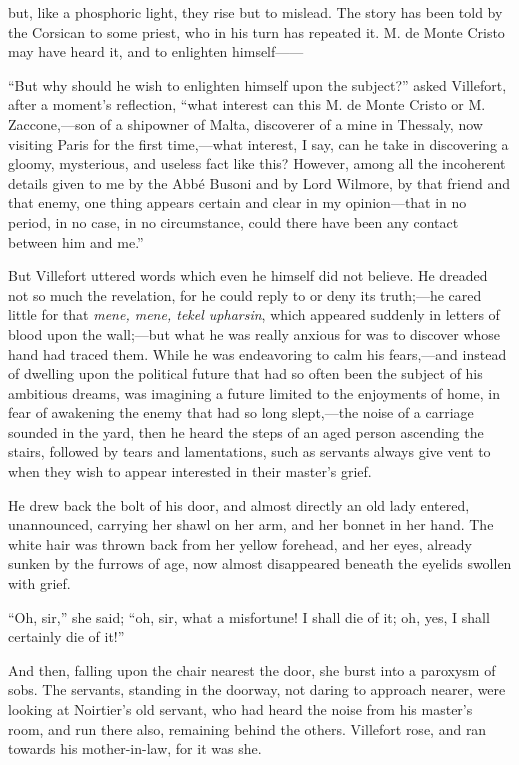 but, like a phosphoric light, they rise but to mislead. The story has
been told by the Corsican to some priest, who in his turn has repeated
it. M. de Monte Cristo may have heard it, and to enlighten himself——

“But why should he wish to enlighten himself upon the subject?” asked
Villefort, after a moment’s reflection, “what interest can this M. de
Monte Cristo or M. Zaccone,—son of a shipowner of Malta, discoverer of
a mine in Thessaly, now visiting Paris for the first time,—what
interest, I say, can he take in discovering a gloomy, mysterious, and
useless fact like this? However, among all the incoherent details given
to me by the Abbé Busoni and by Lord Wilmore, by that friend and that
enemy, one thing appears certain and clear in my opinion—that in no
period, in no case, in no circumstance, could there have been any
contact between him and me.”

But Villefort uttered words which even he himself did not believe. He
dreaded not so much the revelation, for he could reply to or deny its
truth;—he cared little for that \textit{mene, mene, tekel upharsin}, which
appeared suddenly in letters of blood upon the wall;—but what he was
really anxious for was to discover whose hand had traced them. While he
was endeavoring to calm his fears,—and instead of dwelling upon the
political future that had so often been the subject of his ambitious
dreams, was imagining a future limited to the enjoyments of home, in
fear of awakening the enemy that had so long slept,—the noise of a
carriage sounded in the yard, then he heard the steps of an aged person
ascending the stairs, followed by tears and lamentations, such as
servants always give vent to when they wish to appear interested in
their master’s grief.

He drew back the bolt of his door, and almost directly an old lady
entered, unannounced, carrying her shawl on her arm, and her bonnet in
her hand. The white hair was thrown back from her yellow forehead, and
her eyes, already sunken by the furrows of age, now almost disappeared
beneath the eyelids swollen with grief.

“Oh, sir,” she said; “oh, sir, what a misfortune! I shall die of it;
oh, yes, I shall certainly die of it!”

And then, falling upon the chair nearest the door, she burst into a
paroxysm of sobs. The servants, standing in the doorway, not daring to
approach nearer, were looking at Noirtier’s old servant, who had heard
the noise from his master’s room, and run there also, remaining behind
the others. Villefort rose, and ran towards his mother-in-law, for it
was she.

